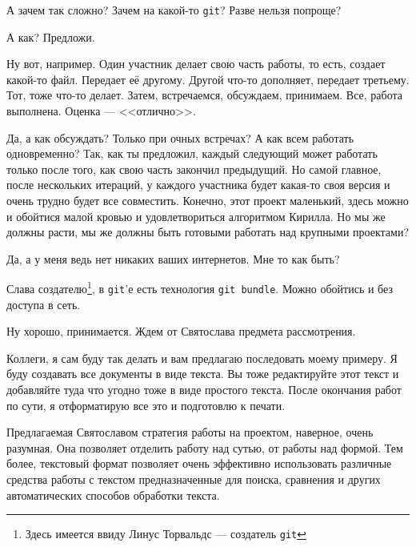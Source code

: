 \documentclass[14pt,a4paper]{article}
\begin{document}
 А зачем так сложно? Зачем на какой-то \texttt{git}? Разве нельзя попроще?

 А как? Предложи.

 Ну вот, например. Один участник делает свою часть работы, то есть, создает какой-то файл.
Передает её другому. Другой что-то дополняет, передает третьему. Тот, тоже что-то делает. Затем,
встречаемся, обсуждаем, принимаем. Все, работа выполнена. Оценка --- <<отлично>>.

 Да, а как обсуждать? Только при очных встречах? А как всем работать одновременно? Так, 
как ты предложил, каждый следующий может работать только после того, как свою часть закончил предыдущий.
Но самой главное, после нескольких итераций, у каждого участника будет какая-то своя версия и очень трудно
будет все совместить. Конечно, этот проект маленький, здесь можно и обойтися малой кровью и удовлетвориться
алгоритмом Кирилла. Но мы же должны расти, мы же должны быть готовыми работать над  крупными проектами?

 Да, а у меня ведь нет никаких ваших интернетов. Мне то как быть?

 Слава создателю\footnote{Здесь имеется ввиду Линус Торвальдс --- создатель \texttt{git}}, в \texttt{git}'е есть технология \texttt{git bundle}. Можно обойтись 
и без доступа в сеть. 

 Ну хорошо, принимается. Ждем от Святослава предмета рассмотрения. 

 Коллеги, я сам буду так делать и вам предлагаю последовать моему примеру. Я буду
создавать все документы в виде текста. Вы тоже редактируйте этот текст и добавляйте туда что угодно
тоже в виде простого текста. После окончания работ по сути, я отформатирую все это и подготовлю к 
печати. 

 Предлагаемая Святославом стратегия работы на проектом, наверное, очень разумная.
Она позволяет отделить работу над сутью, от работы над формой. Тем более, текстовый формат 
позволяет очень эффективно использовать различные средства работы с текстом предназначенные для 
поиска, сравнения и других автоматических способов обработки текста. 
\end{document}
